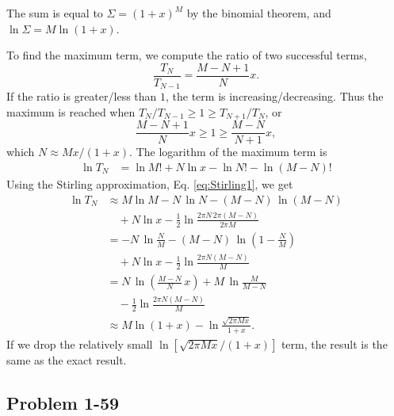 \documentclass[twocolumn, 10pt]{article}
\numberwithin{equation}{section}
\newenvironment{solution}[1][\empty]
{\par\medskip
  \textbf{\ifx\empty#1{Solution.}\relax\else{#1}\fi} \ignorespaces}
{\medskip}
\begin{document}
\begin{solution}
The sum is equal to $\Sigma = (1+x)^M$ by the binomial theorem,
and $\ln \Sigma = M \ln(1+x)$.

To find the maximum term,
we compute the ratio of two successful terms,
$$
  \frac{ T_N } { T_{N - 1} }
  =
  \frac{ M - N + 1 } { N } x.
$$
If the ratio is greater/less than $1$,
the term is increasing/decreasing.
Thus the maximum is reached when
  $T_N/T_{N-1} \ge 1 \ge T_{N+1}/T_N$, or
$$
  \frac{ M - N + 1} { N } x
  \ge 1 \ge
  \frac{ M - N } { N + 1 } x,
$$
which $N \approx M x /(1+x)$.
The logarithm of the maximum term is
\begin{align*}
  \ln T_N
  &= \ln M! + N \ln x - \ln N! - \ln (M-N)!
\end{align*}
%
Using the Stirling approximation, Eq. \eqref{eq:Stirling1},
we get
\begin{align*}
  \ln T_N
  &\approx M \ln M - N \, \ln N - (M - N) \, \ln(M-N) \\
  &\quad + N \ln x
  -\frac{1}{2} \ln\frac{2\pi N \, 2\pi(M-N)}{2\pi M}
  \\
  &=- N \, \ln \frac{N}{M} - (M - N) \, \ln\left(1-\frac{N}{M}\right) \\
  &\quad + N \ln x
  -\frac{1}{2} \ln\frac{2\pi N (M-N)}{M}
  \\
  &=
  N \, \ln\left( \frac{M-N}{N} \, x \right)
  + M \, \ln \frac{M}{M-N}
  \\
  &\quad -\frac{1}{2} \ln\frac{2\pi N (M-N)}{M}
  \\
  &\approx
  M\ln(1+x) - \ln\frac{ \sqrt{2\pi M x} } { 1 + x}
  .
\end{align*}
If we drop the relatively small
$\ln[\sqrt{2\pi M x}/(1 + x)]$ term,
the result is the same as the exact result.
\end{solution}



\subsection{Problem 1-59}
\end{document}
